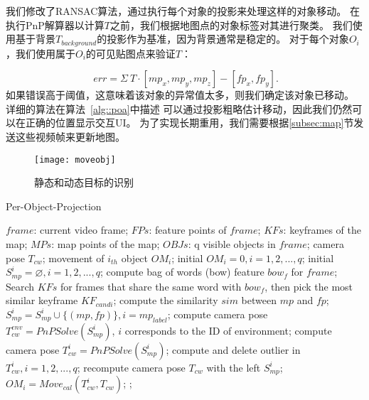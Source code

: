 我们修改了RANSAC算法，通过执行每个对象的投影来处理这样的对象移动。
在执行PnP解算器以计算$T$之前，我们根据地图点的对象标签对其进行聚类。
我们使用基于背景$T_{background}$的投影作为基准，因为背景通常是稳定的。
对于每个对象$O_i$，我们使用属于$O_i$的可见贴图点来验证$T$：

\begin{equation}\label{equ:gdt}
\
err = \Sigma \ T \cdot [mp_x, mp_y, mp_z] - [fp_x, fp_y].
\end{equation}
如果错误高于阈值，这意味着该对象的异常值太多，则我们确定该对象已移动。
详细的算法在算法~\ref{alg::poa}中描述
可以通过投影粗略估计移动，因此我们仍然可以在正确的位置显示交互UI。
为了实现长期重用，我们需要根据\ref{subsec:map}节发送这些视频帧来更新地图。


\begin{figure}[t]
	\centering
	\texttt{[image: moveobj]}
	\caption{静态和动态目标的识别}
	\label{fig:move}
\end{figure}

\begin{algorithm}[t]  
	\caption{Per-Object-Projection }  
	\label{alg::poa}  
	\begin{algorithmic}[1]  
		\Require  
		$frame$: current video frame;
		$FPs$: feature points of $frame$;  
		$KFs$: keyframes of the map;  
		$MPs$: map points of the map;
		$OBJs$: q visible objects in $frame$;   
		\Ensure  
		camera pose $T_{cw}$;
		movement of $i_{th}$ object $OM_i$;
		\State initial $OM_i=0, i = 1,2,...,q$;
		\State initial $S_{mp}^i=\varnothing, i=1,2,...,q$;
		\State compute bag of words (bow) feature $bow_f$ for $frame$;
		\State Search $KFs$ for frames that share the same word with $bow_f$, then pick the most similar keyframe $KF_{candi}$;
		\For{each $mp\in KF_{candi}$}
		compute the similarity $sim$ between $mp$ and $fp$;
		\State $S_{mp}^i = S_{mp}^i\cup\{(mp,fp)\}, i = mp_{label}$;
		\EndIf
		\EndFor 
		\EndFor
		\State compute camera pose $T_{cw}^{env} = PnPSolve(S_{mp}^i)$, $i$ corresponds to the ID of environment;
		\For{each $obj\in OBJs$}
		\State compute camera pose $T_{cw}^{i} = PnPSolve(S_{mp}^i)$;
		\EndFor
		\EndFor
		\State compute and delete outlier in ${T_{cw}^{i}, i=1,2,...,q}$;
		\State recompute camera pose $T_{cw}$ with the left $S_{mp}^i$;
		\State $OM_i = Move_{cal}(T_{cw}^{i}, T_{cw})$; 
		\Else 
		;
		\EndIf
	\end{algorithmic}
\end{algorithm}  

